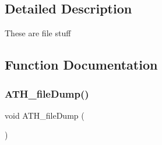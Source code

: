 \subsection{Detailed Description}
These are file stuff 

\subsection{Function Documentation}
\mbox{\label{group__FileUtilities_gae38f94a56afc0ead3a5549bdba1b2df9}} 
\subsubsection{\texorpdfstring{A\+T\+H\+\_\+file\+Dump()}{ATH\_fileDump()}}
{\footnotesize\ttfamily void A\+T\+H\+\_\+file\+Dump (\begin{DoxyParamCaption}{ }\end{DoxyParamCaption})}

